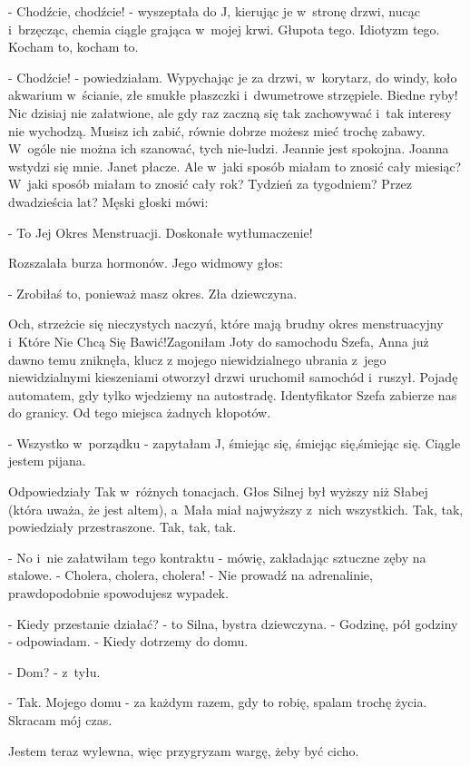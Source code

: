 \documentclass[oneside,polish,12pt,sfheadings]{mwbk}
\begin{document}
- Chodźcie, chodźcie! - wyszeptała do J, kierując je w~stronę drzwi, nucąc i~brzęcząc, chemia ciągle
grająca w~mojej krwi. Głupota tego. Idiotyzm tego. Kocham to, kocham
to. 

- Chodźcie! - powiedziałam. Wypychając je za drzwi, w~korytarz,
do windy, koło akwarium w~ścianie, złe smukłe płaszczki i~dwumetrowe
strzępiele. Biedne ryby! Nic dzisiaj nie załatwione, ale gdy raz zaczną
się tak zachowywać i~tak interesy nie wychodzą. Musisz ich zabić,
równie dobrze możesz mieć trochę zabawy. W~ogóle nie można ich szanować,
tych nie-ludzi. Jeannie jest spokojna. Joanna wstydzi się mnie. Janet
płacze. Ale w~jaki sposób miałam to znosić cały miesiąc? W~jaki sposób
miałam to znosić cały rok? Tydzień za tygodniem? Przez dwadzieścia
lat? Męski głoski mówi: 

- To Jej Okres Menstruacji. Doskonałe wytłumaczenie!

Rozszalała burza hormonów. Jego widmowy głos: 

- Zrobiłaś to, ponieważ masz okres. Zła dziewczyna. 

Och, strzeżcie się nieczystych naczyń, które mają brudny okres menstruacyjny i~Które Nie Chcą Się Bawić!Zagoniłam Joty do samochodu Szefa, Anna już dawno temu zniknęła, klucz
z mojego niewidzialnego ubrania z~jego niewidzialnymi kieszeniami
otworzył drzwi uruchomił samochód i~ruszył. Pojadę automatem, gdy
tylko wjedziemy na autostradę. Identyfikator Szefa zabierze nas do
granicy. Od tego miejsca żadnych kłopotów.

- Wszystko w~porządku - zapytałam J, śmiejąc się, śmiejąc się,śmiejąc
się. Ciągle jestem pijana.

Odpowiedziały Tak w~różnych tonacjach. Głos Silnej był wyższy niż
Słabej (która uważa, że jest altem), a~Mała miał najwyższy z~nich
wszystkich. Tak, tak, powiedziały przestraszone. Tak, tak, tak.

- No i~nie załatwiłam tego kontraktu - mówię, zakładając sztuczne
zęby na stalowe. - Cholera, cholera, cholera! - Nie prowadź na adrenalinie,
prawdopodobnie spowodujesz wypadek.

- Kiedy przestanie działać? - to Silna, bystra dziewczyna. - Godzinę,
pół godziny - odpowiadam. - Kiedy dotrzemy do domu.

- Dom? - z~tyłu.

- Tak. Mojego domu - za każdym razem, gdy to robię, spalam trochę
życia. Skracam mój czas.

Jestem teraz wylewna, więc przygryzam wargę, żeby być cicho.
\end{document}
